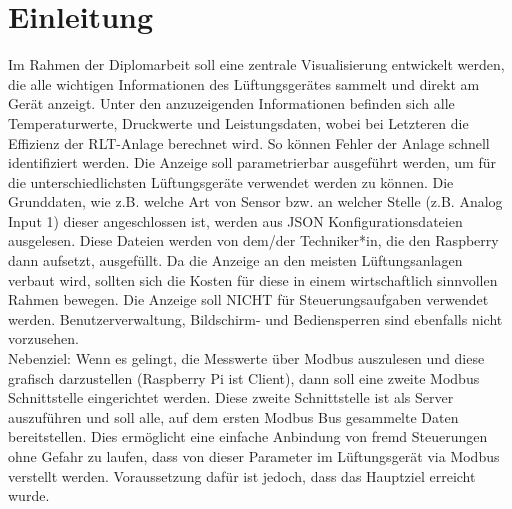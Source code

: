 \chapter{Einleitung} 
\label{aufgabenstellung}
Im Rahmen der Diplomarbeit soll eine zentrale Visualisierung entwickelt werden, die alle 
wichtigen Informationen des Lüftungsgerätes sammelt und direkt am Gerät anzeigt. Unter 
den anzuzeigenden Informationen befinden sich alle Temperaturwerte, Druckwerte und 
Leistungsdaten, wobei bei Letzteren die Effizienz der RLT-Anlage berechnet wird. So können 
Fehler der Anlage schnell identifiziert werden.
Die Anzeige soll parametrierbar ausgeführt werden, um für die unterschiedlichsten 
Lüftungsgeräte verwendet werden zu können. Die Grunddaten, wie z.B. welche Art von 
Sensor bzw. an welcher Stelle (z.B. Analog Input 1) dieser angeschlossen ist, werden aus JSON Konfigurationsdateien ausgelesen. Diese Dateien werden von dem/der Techniker*in, die den 
Raspberry dann aufsetzt, ausgefüllt.
Da die Anzeige an den meisten Lüftungsanlagen verbaut wird, sollten sich die Kosten für 
diese in einem wirtschaftlich sinnvollen Rahmen bewegen.
Die Anzeige soll NICHT für Steuerungsaufgaben verwendet werden. Benutzerverwaltung, 
Bildschirm- und Bediensperren sind ebenfalls nicht vorzusehen. \\

Nebenziel:
Wenn es gelingt, die Messwerte über Modbus auszulesen und diese grafisch darzustellen (Raspberry Pi ist 
Client), dann soll eine zweite Modbus Schnittstelle eingerichtet werden. Diese zweite 
Schnittstelle ist als Server auszuführen und soll alle, auf dem ersten Modbus Bus
gesammelte Daten bereitstellen. Dies ermöglicht eine einfache Anbindung von fremd 
Steuerungen ohne Gefahr zu laufen, dass von dieser Parameter im Lüftungsgerät via 
Modbus verstellt werden. Voraussetzung dafür ist jedoch, dass das Hauptziel erreicht wurde.

